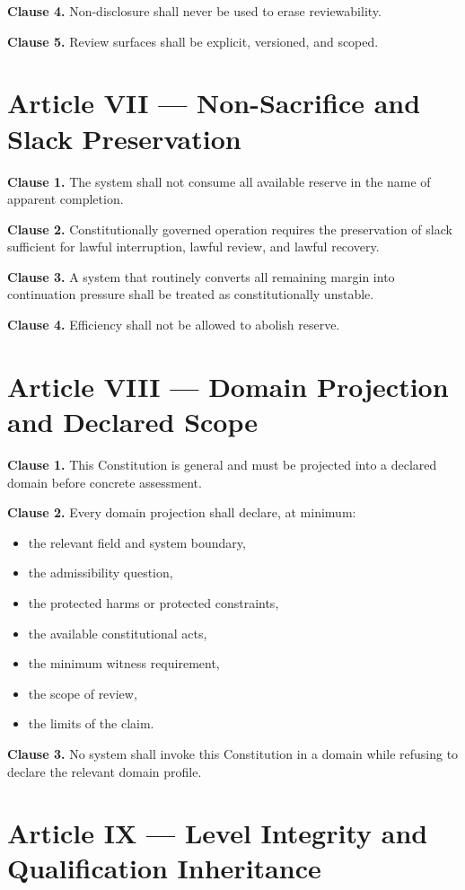 \documentclass[11pt]{article}
\begin{document}
\textbf{Clause 4.} Non-disclosure shall never be used to erase reviewability.

\textbf{Clause 5.} Review surfaces shall be explicit, versioned, and scoped.

\section*{Article VII --- Non-Sacrifice and Slack Preservation}

\textbf{Clause 1.} The system shall not consume all available reserve in the name of apparent completion.

\textbf{Clause 2.} Constitutionally governed operation requires the preservation of slack sufficient for lawful interruption, lawful review, and lawful recovery.

\textbf{Clause 3.} A system that routinely converts all remaining margin into continuation pressure shall be treated as constitutionally unstable.

\textbf{Clause 4.} Efficiency shall not be allowed to abolish reserve.

\section*{Article VIII --- Domain Projection and Declared Scope}

\textbf{Clause 1.} This Constitution is general and must be projected into a declared domain before concrete assessment.

\textbf{Clause 2.} Every domain projection shall declare, at minimum:
\begin{itemize}[leftmargin=2em]
    \item the relevant field and system boundary,
    \item the admissibility question,
    \item the protected harms or protected constraints,
    \item the available constitutional acts,
    \item the minimum witness requirement,
    \item the scope of review,
    \item the limits of the claim.
\end{itemize}

\textbf{Clause 3.} No system shall invoke this Constitution in a domain while refusing to declare the relevant domain profile.

\section*{Article IX --- Level Integrity and Qualification Inheritance}
\end{document}
